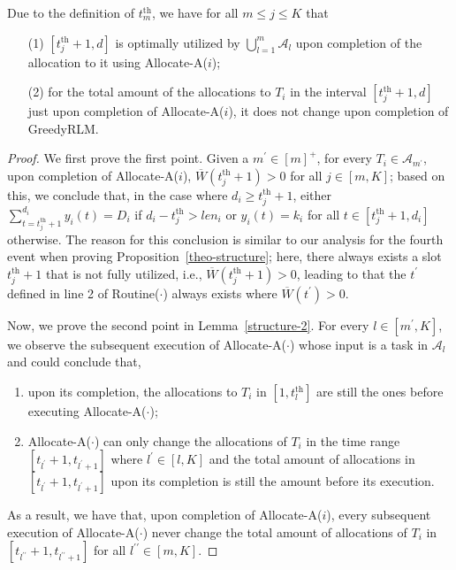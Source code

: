 \documentclass[10pt,journal,compsoc]{IEEEtran}
\newcommand{\tth}{t^{\textrm{th}}}
\begin{document}
\begin{lemma}\label{structure-2}
Due to the definition of $\tth_{m}$, we have for all $m\leq j\leq K$ that
\begin{itemize}
 \setlength\itemsep{0.25em}
\item [(1)] $[ \tth_{j}+1, d ]$ is optimally utilized by $\bigcup_{l=1}^{m}{\mathcal{A}_{l}}$ upon completion of the allocation to it using Allocate-A($i$);
\item [(2)] for the total amount of the allocations to $T_{i}$ in the interval $[ \tth_{j}+1, d ]$ just upon completion of Allocate-A($i$), it does not change upon completion of GreedyRLM.
\end{itemize}
\end{lemma}
\begin{proof}
We first prove the first point. Given a $m^{\prime}\in [m]^{+}$, for every $T_{i}\in\mathcal{A}_{m^{\prime}}$, upon completion of Allocate-A($i$), $\overline{W}(\tth_{j}+1)>0$ for all $j\in [m, K]$; based on this, we conclude that, in the case where $d_{i}\geq \tth_{j}+1$, either $\sum_{t=\tth_{j}+1}^{d_{i}}{y_{i}(t)}=D_{i}$ if $d_{i}-\tth_{j}>len_{i}$ or $y_{i}(t)=k_{i}$ for all $t\in [\tth_{j}+1, d_{i}]$ otherwise. The reason for this conclusion is similar to our analysis for the fourth event when proving Proposition~\ref{theo-structure}; here, there always exists a slot $\tth_{j}+1$ that is not fully utilized, i.e., $\overline{W}(\tth_{j}+1)>0$, leading to that the $t^{\prime}$ defined in line 2 of Routine($\cdot$) always exists where $\overline{W}(t^{\prime})>0$.




Now, we prove the second point in Lemma~\ref{structure-2}. For every $l\in [m^{\prime}, K]$, we observe the subsequent execution of Allocate-A($\cdot$) whose input is a task in $\mathcal{A}_{l}$ and could conclude that,
\begin{enumerate}
 \setlength\itemsep{0.2em}

\item upon its completion, the allocations to $T_{i}$ in $[1, \tth_{l}]$ are still the ones before executing Allocate-A($\cdot$);

\item Allocate-A($\cdot$) can only change the allocations of $T_{i}$ in the time range $[t_{l^{\prime}}+1, t_{l^{\prime}+1}]$ where $l^{\prime} \in [l, K]$ and the total amount of allocations in $[t_{l^{\prime}}+1, t_{l^{\prime}+1}]$ upon its completion is still the amount before its execution.
\end{enumerate}
As a result, we have that, upon completion of Allocate-A($i$), every subsequent execution of Allocate-A($\cdot$) never change the total amount of allocations of $T_{i}$ in $[t_{l^{\prime\prime}}+1, t_{l^{\prime\prime}+1}]$ for all $l^{\prime\prime}\in [m, K]$. 


\end{proof}
\end{document}
